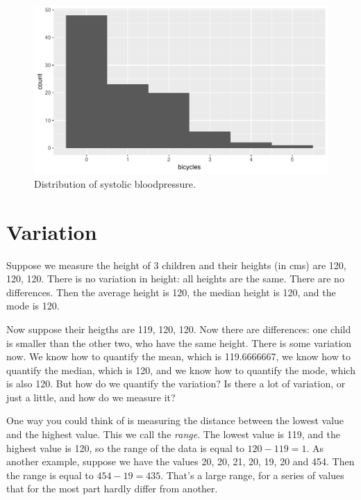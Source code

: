 \documentclass[]{report}\usepackage[]{graphicx}\usepackage[]{color}
\makeatletter
\def\maxwidth{ %
  \ifdim\Gin@nat@width>\linewidth
    \linewidth
  \else
    \Gin@nat@width
  \fi
}
\makeatother
\begin{document}
\begin{enumerate}
\begin{figure}
{\centering \includegraphics[width=\maxwidth]{figure/mode2-1} 

}

\caption[Distribution of systolic bloodpressure]{Distribution of systolic bloodpressure.}\label{fig:mode2}
\end{figure}





\end{enumerate}



\section{Variation}

Suppose we measure the height of 3 children and their heights (in cms) are 120, 120, 120. There is no variation in height: all heights are the same. There are no differences. Then the average height is 120, the median height is 120, and the mode is 120. 

Now suppose their heigths are 119, 120, 120. Now there are differences: one child is smaller than the other two, who have the same height. There is some variation now. We know how to quantify the mean, which is 119.6666667, we know how to quantify the median, which is 120, and we know how to quantify the mode, which is also 120. But how do we quantify the variation? Is there a lot of variation, or just a little, and how do we measure it? 

One way you could think of is measuring the distance between the lowest value and the highest value. This we call the \textit{range}. The lowest value is 119, and the highest value is 120, so the range of the data is equal to $120-119=1$. As another example, suppose we have the values 20, 20, 21, 20, 19, 20 and 454. Then the range is equal to $454-19=435$. That's a large range, for a series of values that for the most part hardly differ from another. 
\end{document}
